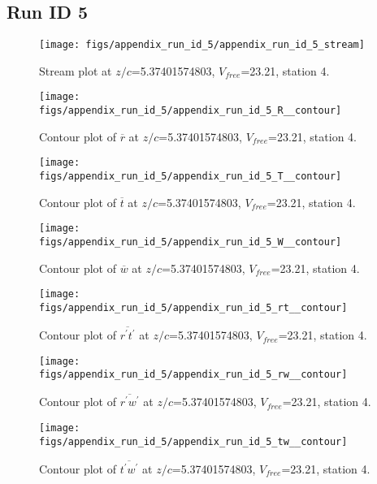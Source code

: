 \subsection{Run ID 5}
\begin{figure}[H]
\centering
\texttt{[image: figs/appendix\_run\_id\_5/appendix\_run\_id\_5\_stream]}
\caption{Stream plot at $z/c$=5.37401574803, $V_{free}$=23.21, station 4.}
\label{fig:appendix_run_id_5_stream}
\end{figure}


\begin{figure}[H]
\centering
\texttt{[image: figs/appendix\_run\_id\_5/appendix\_run\_id\_5\_R\_\_contour]}
\caption{Contour plot of $\overline{r}$ at $z/c$=5.37401574803, $V_{free}$=23.21, station 4.}
\label{fig:appendix_run_id_5_R__contour}
\end{figure}


\begin{figure}[H]
\centering
\texttt{[image: figs/appendix\_run\_id\_5/appendix\_run\_id\_5\_T\_\_contour]}
\caption{Contour plot of $\overline{t}$ at $z/c$=5.37401574803, $V_{free}$=23.21, station 4.}
\label{fig:appendix_run_id_5_T__contour}
\end{figure}


\begin{figure}[H]
\centering
\texttt{[image: figs/appendix\_run\_id\_5/appendix\_run\_id\_5\_W\_\_contour]}
\caption{Contour plot of $\overline{w}$ at $z/c$=5.37401574803, $V_{free}$=23.21, station 4.}
\label{fig:appendix_run_id_5_W__contour}
\end{figure}


\begin{figure}[H]
\centering
\texttt{[image: figs/appendix\_run\_id\_5/appendix\_run\_id\_5\_rt\_\_contour]}
\caption{Contour plot of $\overline{r^\prime t^\prime}$ at $z/c$=5.37401574803, $V_{free}$=23.21, station 4.}
\label{fig:appendix_run_id_5_rt__contour}
\end{figure}


\begin{figure}[H]
\centering
\texttt{[image: figs/appendix\_run\_id\_5/appendix\_run\_id\_5\_rw\_\_contour]}
\caption{Contour plot of $\overline{r^\prime w^\prime}$ at $z/c$=5.37401574803, $V_{free}$=23.21, station 4.}
\label{fig:appendix_run_id_5_rw__contour}
\end{figure}


\begin{figure}[H]
\centering
\texttt{[image: figs/appendix\_run\_id\_5/appendix\_run\_id\_5\_tw\_\_contour]}
\caption{Contour plot of $\overline{t^\prime w^\prime}$ at $z/c$=5.37401574803, $V_{free}$=23.21, station 4.}
\label{fig:appendix_run_id_5_tw__contour}
\end{figure}


